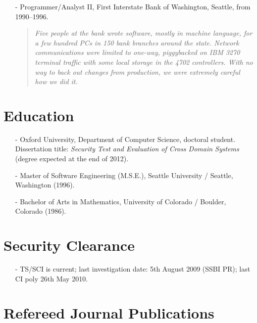 \documentclass[letterpaper]{article}
\begin{document}
\begin{itemize}
	\item[-] Programmer/Analyst II, First Interstate Bank of Washington, Seattle, from 1990--1996.

		\begin{quote}\vspace{-2mm}
			\emph{Five people at the bank wrote software, mostly in machine language, for a few
			hundred PCs in 150 bank branches around the state.  Network communications were
			limited to one-way, piggybacked on IBM 3270 terminal traffic with some local
			storage in the 4702 controllers.  With no way to back out changes from production,
			we were extremely careful how we did it.}
		\end{quote}

\end{itemize}

\section*{Education} %

\begin{itemize}
    \item[-] Oxford University, Department of Computer Science,
		doctoral student.  Dissertation title: \emph{Security Test and Evaluation
		of Cross Domain Systems} (degree expected at the end of 2012).

    \item[-] Master of Software Engineering (M.S.E.), Seattle
		University / Seattle, Washington (1996).

    \item[-] Bachelor of Arts in Mathematics, University of
		Colorado / Boulder, Colorado (1986).
\end{itemize}

\section*{Security Clearance}

\begin{itemize}
	\item[-] TS/SCI is current; last investigation date: 5th August 2009 (SSBI PR);
		last CI poly 26th May 2010.
\end{itemize}

\section*{Refereed Journal Publications} %
\end{document}
